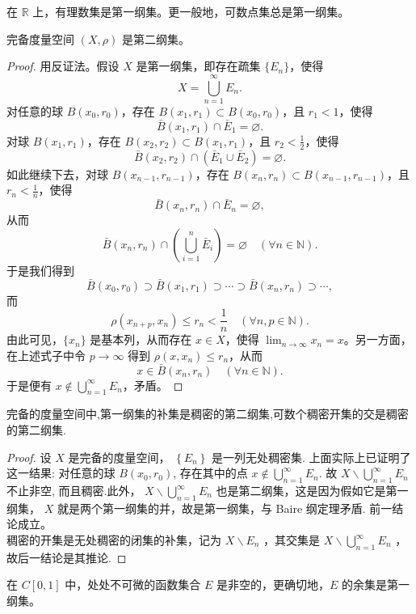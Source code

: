 \documentclass[lang=cn,newtx,10pt,scheme=chinese,thmcnt=chapter]{elegantbook}
\begin{document}
\begin{example}
	在 $\mathbb{R}$ 上，有理数集是第一纲集。更一般地，可数点集总是第一纲集。
\end{example}



\begin{theorem}[Baire]
	完备度量空间 $({X}, \rho)$ 是第二纲集。
\end{theorem}

\begin{proof}
	用反证法。假设 ${X}$ 是第一纲集，即存在疏集 $\{E_n\}$，使得
	\[
	{X} = \bigcup_{n=1}^{\infty} E_n.
	\]
	对任意的球 $B\left(x_0, r_0\right)$，存在 $B\left(x_1, r_1\right) \subset B\left(x_0, r_0\right)$，且 $r_1 < 1$，使得
	\[
	\bar{B}\left(x_1, r_1\right) \cap \bar{E}_1 = \varnothing.
	\]
	对球 $B\left(x_1, r_1\right)$，存在 $B\left(x_2, r_2\right) \subset B\left(x_1, r_1\right)$，且 $r_2 < \frac{1}{2}$，使得
	\[
	\bar{B}\left(x_2, r_2\right) \cap \left(\bar{E}_1 \cup \bar{E}_2\right) = \varnothing.
	\]
	如此继续下去，对球 $B\left(x_{n-1}, r_{n-1}\right)$，存在 $B\left(x_n, r_n\right) \subset B\left(x_{n-1}, r_{n-1}\right)$，且 $r_n < \frac{1}{n}$，使得
	\[
	\bar{B}\left(x_n, r_n\right) \cap \bar{E}_n = \varnothing,
	\]
	从而
	\[
	\bar{B}\left(x_n, r_n\right) \cap \left(\bigcup_{i=1}^n \bar{E}_i\right) = \varnothing \quad (\forall n \in \mathbb{N}).
	\]
	于是我们得到
	\[
	\bar{B}\left(x_0, r_0\right) \supset \bar{B}\left(x_1, r_1\right) \supset \cdots \supset \bar{B}\left(x_n, r_n\right) \supset \cdots,
	\]
	而
	\[
	\rho\left(x_{n+p}, x_n\right) \leqslant r_n < \frac{1}{n} \quad (\forall n, p \in \mathbb{N}).
	\]
	由此可见，$\{x_n\}$ 是基本列，从而存在 $x \in {X}$，使得 $\lim_{n \to \infty} x_n = x$。另一方面，在上述式子中令 $p \to \infty$ 得到 $\rho\left(x, x_n\right) \leqslant r_n$，从而
	\[
	x \in \bar{B}\left(x_n, r_n\right) \quad (\forall n \in \mathbb{N}).
	\]
	于是便有 $x \notin \bigcup_{n=1}^{\infty} E_n$，矛盾。
\end{proof}
\begin{theorem}完备的度量空间中,第一纲集的补集是稠密的第二纲集,可数个稠密开集的交是稠密的第二纲集.
\end{theorem}
\begin{proof}
	设 $X$ 是完备的度量空间， $\left\{E_n\right\}$ 是一列无处稠密集.
	上面实际上已证明了这一结果: 对任意的球 $B\left(x_0, r_0\right)$, 存在其中的点 $x \notin \bigcup_{n=1}^{\infty} E_n$. 故 $X \backslash \bigcup_{n=1}^{\infty} E_n$ 不止非空, 而且稠密.此外， $X \backslash \bigcup_{n=1}^{\infty} E_n$ 也是第二纲集，这是因为假如它是第一纲集， $X$ 就是两个第一纲集的并，故是第一纲集，与 Baire 纲定理矛盾. 前一结论成立。\\
	稠密的开集是无处稠密的闭集的补集，记为 $X \backslash E_n$ ，其交集是 $X \backslash \bigcup_{n=1}^{\infty} E_n$ ，故后一结论是其推论.
\end{proof}
\begin{theorem}
	在 $C[0,1]$ 中，处处不可微的函数集合 $E$ 是非空的，更确切地，$E$ 的余集是第一纲集。
\end{theorem}
\end{document}
